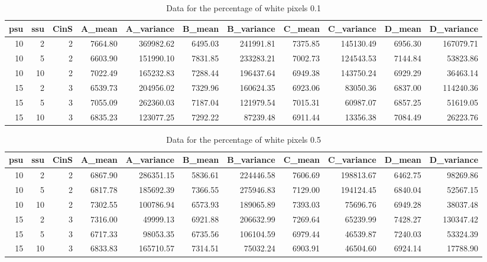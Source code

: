 \documentclass{article}
\begin{document}
\begin{table}[htbp]
\centering
\begin{tabular}{rrrrrrrrrrr}
\hline
psu & ssu & CinS & A\_mean & A\_variance & B\_mean & B\_variance & C\_mean & C\_variance & D\_mean & D\_variance \\
\hline
10 & 2 & 2 & 7664.80 & 369982.62 & 6495.03 & 241991.81 & 7375.85 & 145130.49 & 6956.30 & 167079.71 \\
10 & 5 & 2 & 6603.90 & 151990.10 & 7831.85 & 233283.21 & 7002.73 & 124543.53 & 7144.84 & 53823.86 \\
10 & 10 & 2 & 7022.49 & 165232.83 & 7288.44 & 196437.64 & 6949.38 & 143750.24 & 6929.29 & 36463.14 \\
15 & 2 & 3 & 6539.73 & 204956.02 & 7329.96 & 160624.35 & 6923.06 & 83050.36 & 6837.00 & 114240.36 \\
15 & 5 & 3 & 7055.09 & 262360.03 & 7187.04 & 121979.54 & 7015.31 & 60987.07 & 6857.25 & 51619.05 \\
15 & 10 & 3 & 6835.23 & 123077.25 & 7292.22 & 87239.48 & 6911.44 & 13356.38 & 7084.49 & 26223.76 \\
\hline
\end{tabular}
\caption{Data for the percentage of white pixels 0.1}
\label{tab:white_0.1}
\end{table}

\begin{table}[htbp]
\centering
\begin{tabular}{rrrrrrrrrrr}
\hline
psu & ssu & CinS & A\_mean & A\_variance & B\_mean & B\_variance & C\_mean & C\_variance & D\_mean & D\_variance \\
\hline
10 & 2 & 2 & 6867.90 & 286351.15 & 5836.61 & 224446.58 & 7606.69 & 198813.67 & 6462.75 & 98269.86 \\
10 & 5 & 2 & 6817.78 & 185692.39 & 7366.55 & 275946.83 & 7129.00 & 194124.45 & 6840.04 & 52567.15 \\
10 & 10 & 2 & 7302.55 & 100786.94 & 6573.93 & 189065.89 & 7393.03 & 75696.76 & 6949.28 & 38037.48 \\
15 & 2 & 3 & 7316.00 & 49999.13 & 6921.88 & 206632.99 & 7269.64 & 65239.99 & 7428.27 & 130347.42 \\
15 & 5 & 3 & 6717.33 & 98053.35 & 6735.56 & 106104.59 & 6979.44 & 46539.87 & 7240.03 & 53324.39 \\
15 & 10 & 3 & 6833.83 & 165710.57 & 7314.51 & 75032.24 & 6903.91 & 46504.60 & 6924.14 & 17788.90 \\
\hline
\end{tabular}
\caption{Data for the percentage of white pixels 0.5}
\label{tab:white_0.5}
\end{table}
\end{document}
